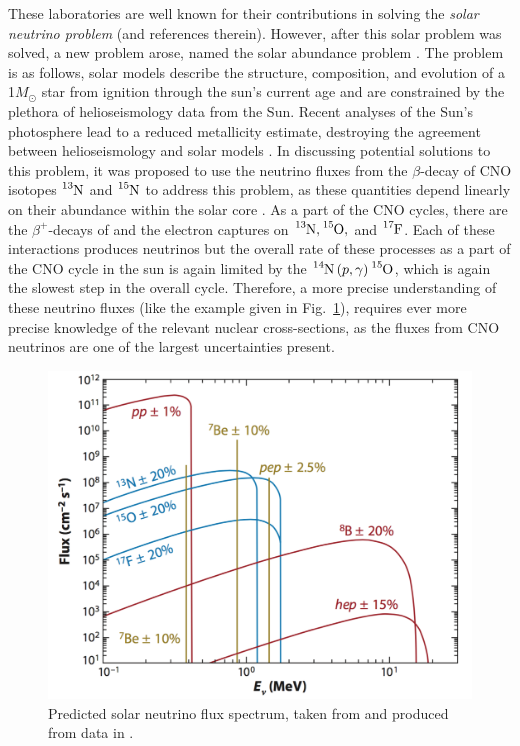 These laboratories are well known for their contributions in solving the \textsl{solar neutrino problem} \cite{Jose2011a} (and references therein). However, after this solar problem was solved, a new problem arose, named the solar abundance problem \cite{Adelberger2011, Serenelli2009}. The problem is as follows, solar models describe the structure, composition, and evolution of a 1$M_{\odot}$ star from ignition through the sun's current age and are constrained by the plethora of helioseismology data from the Sun. Recent analyses of the Sun's photosphere lead to a reduced metallicity estimate, destroying the agreement between helioseismology and solar models \cite{Asplund2009}. In discussing potential solutions to this problem, it was proposed to use the neutrino fluxes from the $\beta$-decay of CNO isotopes $\ce{^{13}N}$ and $\ce{^{15}N}$ to address this problem, as these quantities depend linearly on their abundance within the solar core \cite{Bahcall2005a, Bahcall2005b}. As a part of the CNO cycles, there are the $\beta^{+}$-decays of and the electron captures on $\ce{^{13}N}, \ce{^{15}O},$ and $\ce{^{17}F}$.  Each of these interactions produces neutrinos but the overall rate of these processes as a part of the CNO cycle in the sun is again limited by the $\ce{^{14}N} \left( p, \gamma \right) \ce{^{15}O}$, which is again the slowest step in the overall cycle. Therefore, a more precise understanding of these neutrino fluxes (like the example given in Fig.\ \ref{fig: neutrinoSpectrum}), requires ever more precise knowledge of the relevant nuclear cross-sections, as the fluxes from CNO neutrinos are one of the largest uncertainties present. 



\begin{figure}
\centering
\includegraphics[width=\linewidth]{figures/neutrinoFlux.png}
\caption{Predicted solar neutrino flux spectrum, taken from \cite{Wiescher2010} and produced from data in \cite{Bahcall2004}.   }
\label{fig: neutrinoSpectrum}
\end{figure}



